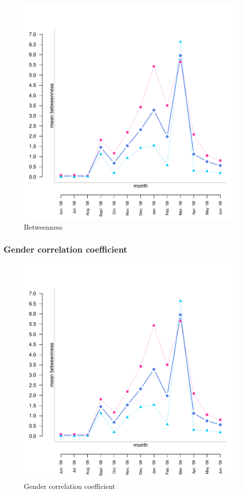 \begin{figure}[htpb]
\begin{center}
  \includegraphics[width=.6\textwidth]{assets/pdf/long_betweenness.pdf}
  \caption[Betweenness]{Betweenness}
  \label{fig:long_betweenness}
\end{center}
\end{figure} 


\subsubsection*{Gender correlation coefficient}

\begin{figure}[htpb]
\begin{center}
  \includegraphics[width=.6\textwidth]{assets/pdf/long_betweenness.pdf}
  \caption[Gender correlation coefficient]{Gender correlation coefficient}
  \label{fig:long_gender_corr}
\end{center}
\end{figure} 


